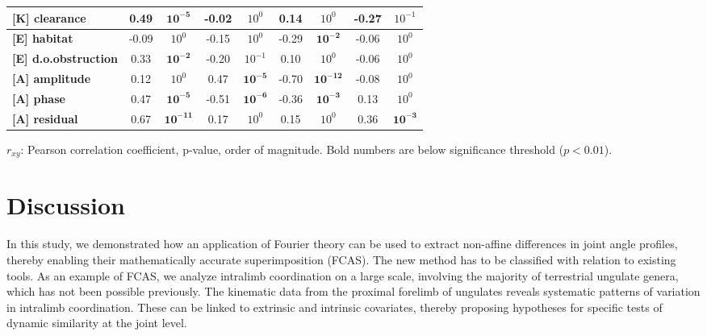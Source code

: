 \begin{table}[b!]
\begin{tabular}{l @{$\quad$} cc @{$\quad$} cc @{$\quad$} cc @{$\quad$} cc}
\textbf{[K] clearance        } &                     0.49 &      $\mathbf{10^{-5}}$ &                    -0.02 &   $10^{0}$ &                     0.14 &   $10^{0}$ &                    -0.27 &  $10^{-1}$ \\
\midrule\textbf{[E] habitat          } &                    -0.09 &   $10^{0}$ &                    -0.15 &   $10^{0}$ &                    -0.29 &      $\mathbf{10^{-2}}$ &                    -0.06 &   $10^{0}$ \\
\textbf{[E] d.o.obstruction  } &                     0.33 &      $\mathbf{10^{-2}}$ &                    -0.20 &  $10^{-1}$ &                     0.10 &   $10^{0}$ &                    -0.06 &   $10^{0}$ \\
\midrule\textbf{[A] amplitude        } &                     0.12 &   $10^{0}$ &                     0.47 &      $\mathbf{10^{-5}}$ &                    -0.70 &     $\mathbf{10^{-12}}$ &                    -0.08 &   $10^{0}$ \\
\textbf{[A] phase            } &                     0.47 &      $\mathbf{10^{-5}}$ &                    -0.51 &      $\mathbf{10^{-6}}$ &                    -0.36 &      $\mathbf{10^{-3}}$ &                     0.13 &   $10^{0}$ \\
\textbf{[A] residual         } &                     0.67 &     $\mathbf{10^{-11}}$ &                     0.17 &   $10^{0}$ &                     0.15 &   $10^{0}$ &                     0.36 &      $\mathbf{10^{-3}}$ \\
\bottomrule
\end{tabular}\bigskip
\begin{flushleft}
$r_{xy}$: Pearson correlation coefficient,  p-value, order of magnitude. Bold numbers are below significance threshold ($p < 0.01$).
\end{flushleft}
\label{tab:correlations}
\end{table}




\FloatBarrier\clearpage
\section{Discussion}
In this study, we demonstrated how an application of Fourier theory can be used to extract non-affine differences in joint angle profiles, thereby enabling their mathematically accurate superimposition (FCAS).
The new method has to be classified with relation to existing tools.
As an example of FCAS, we analyze intralimb coordination on a large scale, involving the majority of terrestrial ungulate genera, which has not been possible previously.
The kinematic data from the proximal forelimb of ungulates reveals systematic patterns of variation in intralimb coordination.
These can be linked to extrinsic and intrinsic covariates, thereby proposing hypotheses for specific tests of dynamic similarity at the joint level.


